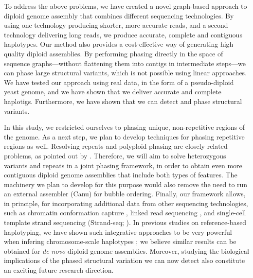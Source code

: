 To address the above problems, we have created a novel graph-based approach to diploid genome assembly that combines different sequencing technologies.
By using one technology producing shorter, more accurate reads, and a second technology delivering long reads, we produce accurate, complete and contiguous haplotypes. 
Our method also provides a cost-effective way of generating high quality diploid assemblies.
By performing phasing directly in the space of sequence graphs---without flattening them into contigs in intermediate steps---we can phase large structural variants, which is not possible using linear approaches. 
We have tested our approach using real data, in the form of a pseudo-diploid yeast genome, and we have shown that we deliver accurate and complete haplotigs.
Furthermore, we have shown that we can detect and phase structural variants.

In this study, we restricted ourselves to phasing unique, non-repetitive regions of the genome.
As a next step, we plan to develop techniques for phasing repetitive regions as well.
Resolving repeats and polyploid phasing are closely related problems, as pointed out by \cite{Chaisson2017}.
Therefore, we will aim to solve heterozygous variants and repeats in a joint phasing framework, in order to obtain even more contiguous diploid genome assemblies that include both types of features.
The machinery we plan to develop for this purpose would also remove the need to run an external assembler (Canu) for bubble ordering.
Finally, our framework allows, in principle, for incorporating additional data from other sequencing technologies, such as chromatin conformation capture \citep{burton2013chromosome}, linked read sequencing \citep{weisenfeld2017direct}, and single-cell template strand sequencing (Strand-seq; \citealp{Porubsky2016}).
In previous studies on reference-based haplotyping, we have shown such integrative approaches to be very powerful when infering chromosome-scale haplotypes \citep{porubsky2017dense,chaisson2017multi}; we believe similar results can be obtained for \textit{de novo} diploid genome assemblies.
Moreover, studying the biological implications of the phased structural variation we can now detect also constitute an exciting future research direction.

